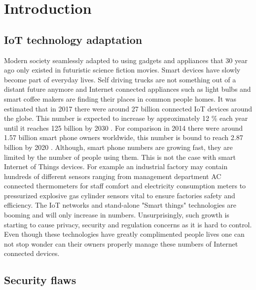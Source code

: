\section{Introduction}

\subsection{IoT technology adaptation}
Modern society seamlessly adapted to using gadgets and appliances that 30 year ago only existed in futuristic science fiction movies. Smart devices have slowly become part of everyday lives. Self driving trucks are not something out of a distant future anymore\cite{freedman_2017} and Internet connected appliances such as light bulbs and  smart coffee makers are finding their places in common people homes. It was estimated that in 2017 there were around 27 billion connected IoT devices around the globe. This number is expected to increase by approximately 12 \% each year until it reaches 125 billion by 2030 \cite{ihs-markit}. For comparison in 2014 there were around 1.57 billion smart phone owners worldwide, this number is bound to reach 2.87 billion by 2020 \cite{statista}. Although, smart phone numbers are growing fast, they are limited by the number of people using them. This is not the case with smart Internet of Things devices. For example an industrial factory may contain hundreds of different sensors ranging from management department AC connected thermometers for staff comfort and electricity consumption meters to pressurized explosive gas cylinder sensors vital to ensure factories safety and efficiency. The IoT networks and stand-alone "Smart things" technologies are booming \cite{gartner2018} and will only increase in numbers. Unsurprisingly, such growth is starting to cause privacy, security and regulation concerns as it is hard to control. Even though these technologies have greatly complimented people lives one can not stop wonder can their owners properly manage these numbers of Internet connected devices.

\subsection{Security flaws}

